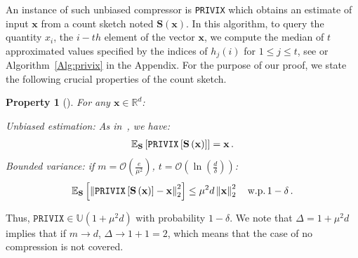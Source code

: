 \documentclass[twoside]{article}
\newtheorem{property}{Property}
\begin{document}
An instance of such unbiased compressor is \texttt{PRIVIX} which obtains an estimate of input $\boldsymbol{x}$ from a count sketch noted $\boldsymbol{S}(\boldsymbol{x})$. 
In this algorithm, to query the quantity $x_i$, the $i-th$ element of the vector $\boldsymbol{x}$, we compute the median of $t$ approximated values specified by the indices of $h_j(i)$ for $1\leq j\leq t$, see \cite{li2019privacy} or Algorithm~\ref{Alg:privix} in the Appendix.
For the purpose of our proof, we state the following crucial properties of the count sketch.
\begin{property}[\cite{li2019privacy}]
For any $\mathbf{x}\in \mathbb{R}^{d}$:

\emph{Unbiased estimation}: As in~\cite{li2019privacy}, we have:
    \begin{align}\notag
        \mathbb{E}_{\mathbf{S}}\left[\texttt{PRIVIX}\left[\mathbf{S}\left(\mathbf{x}\right)\right]\right]=\mathbf{x}\, .
    \end{align}
\emph{Bounded variance:} if $m=\mathcal{O}\left(\frac{e}{\mu^2}\right)$, $t=\mathcal{O}\left(\ln \left(\frac{d}{\delta}\right)\right)$:
    \begin{align}\notag
        \mathbb{E}_{\mathbf{S}}\left[\left\|\texttt{PRIVIX}\left[\mathbf{S}\left(\mathbf{x}\right)\right]-\mathbf{x}\right\|_2^2\right]\leq \mu^2 d\left\|\mathbf{x}\right\|_2^2 \quad \textrm{w.p.} \, 1-\delta \, . 
    \end{align}

\end{property}
Thus, $\texttt{PRIVIX}\in \mathbb{U}(1+\mu^2 d)$ with probability $1-\delta$.
We note that $\Delta=1+\mu^2d$ implies that if $m\rightarrow d$, $\Delta\rightarrow 1+1=2$, which means that the case of no compression is not covered. 
\end{document}
